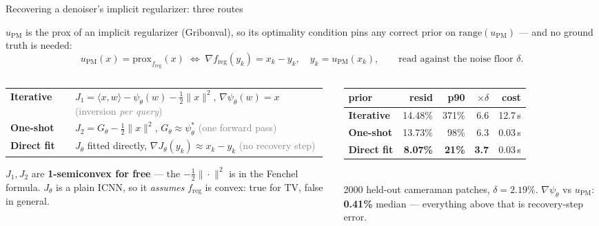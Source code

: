 \documentclass[aspectratio=169,10pt]{beamer}
\newcommand{\Iter}{\textcolor{iter}{\textbf{Iterative}}}
\newcommand{\Osh}{\textcolor{oneshot}{\textbf{One-shot}}}
\newcommand{\Dir}{\textcolor{direct}{\textbf{Direct fit}}}
\newcommand{\upm}{u_{\mathrm{PM}}}
\newcommand{\freg}{f_{\mathrm{reg}}}
\begin{document}
\begin{frame}{Recovering a denoiser's implicit regularizer: three routes}
  \scriptsize

  $\upm$ is the prox of an implicit regularizer (Gribonval), so its optimality
  condition pins any correct prior on $\mathrm{range}(\upm)$ --- and no ground
  truth is needed:
  \vspace{-0.3em}
  \[
    \upm(x)=\mathrm{prox}_{\freg}(x)
    \;\iff\;
    \nabla \freg(y_k)=x_k-y_k,\quad y_k=\upm(x_k),
    \qquad\text{read against the noise floor }\delta .
  \]
  \vspace{-1.5em}

  \begin{columns}[T]
    \begin{column}{0.545\textwidth}
      \begin{tabular}{@{}p{0.20\linewidth}@{}p{0.78\linewidth}@{}}
        \toprule
        \Iter & $J_1=\langle x,w\rangle-\psi_\theta(w)-\tfrac12\|x\|^2$,\;
                $\nabla\psi_\theta(w)=x$ \;\textcolor{gray}{(inversion \emph{per query})}\\[0.2em]
        \Osh  & $J_2=G_\theta-\tfrac12\|x\|^2$,\; $G_\theta\approx\psi_\theta^{*}$
                \;\textcolor{gray}{(one forward pass)}\\[0.2em]
        \Dir  & $J_\theta$ fitted directly, $\nabla J_\theta(y_k)\approx x_k-y_k$
                \;\textcolor{gray}{(no recovery step)}\\
        \bottomrule
      \end{tabular}
      \vspace{0.25em}

      $J_1,J_2$ are \textbf{1-semiconvex for free} --- the $-\tfrac12\|\cdot\|^2$
      is in the Fenchel formula. $J_\theta$ is a plain ICNN, so it \emph{assumes}
      $\freg$ is convex: true for TV, false in general.
    \end{column}
    \begin{column}{0.445\textwidth}
      \centering
      \begin{tabular}{@{}lrrrr@{}}
        \toprule
        prior & resid & p90 & $\times\delta$ & cost \\
        \midrule
        \Iter & 14.48\% & \textcolor{bad}{371\%} & 6.6 & 12.7\,s \\
        \Osh  & 13.73\% & 98\% & 6.3 & 0.03\,s \\
        \Dir  & \textbf{8.07\%} & \textbf{21\%} & \textbf{3.7} & 0.03\,s \\
        \bottomrule
      \end{tabular}\\[0.2em]
      {\tiny 2000 held-out cameraman patches, $\delta=2.19\%$.\;
       $\nabla\psi_\theta$ vs $\upm$: \textbf{0.41\%} median --- everything above
       that is recovery-step error.}
    \end{column}
  \end{columns}


\end{frame}
\end{document}
